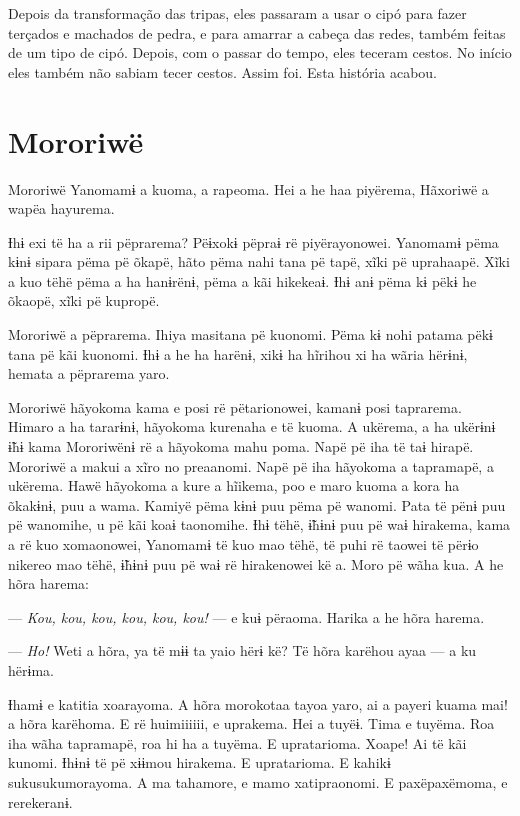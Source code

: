 Depois da transformação das tripas, eles passaram a usar o cipó para
fazer terçados e machados de pedra, e para amarrar a cabeça das redes,
também feitas de um tipo de cipó. Depois, com o passar do tempo, eles
teceram cestos. No início eles também não sabiam tecer cestos. Assim
foi. Esta história acabou.

\chapter{Mororiwë}

 Mororiwë Yanomamɨ a kuoma, a rapeoma. Hei a he haa piyërema,
Hãxoriwë a wapëa hayurema. 

Ɨhɨ exi të ha a rii pëprarema? Pëɨxokɨ pëpraɨ rë piyërayonowei. Yanomamɨ
 pëma kɨnɨ sipara pëma pë õkapë, hãto pëma nahi tana pë tapë, xĩki pë
 uprahaapë. Xĩki a kuo tëhë pëma a ha hanɨrënɨ, pëma a kãi hikekeaɨ. Ɨhɨ
 anɨ pëma kɨ pëkɨ he õkaopë, xĩki pë kupropë.

Mororiwë a pëprarema. Ihiya masitana pë kuonomi. Pëma kɨ nohi patama
pëkɨ tana pë kãi kuonomi. Ɨhɨ a he ha harënɨ, xikɨ ha hĩrihou xi ha
wãria hërɨnɨ, hemata a pëprarema yaro. 

Mororiwë hãyokoma kama e posi rë pëtarionowei, kamanɨ posi taprarema.
 Himaro a ha tararɨnɨ, hãyokoma kurenaha e të kuoma. A ukërema, a ha
 ukërɨnɨ ɨ̃hɨ kama Mororiwënɨ rë a hãyokoma mahu poma. Napë pë iha të taɨ
 hirapë. Mororiwë a makui a xĩro no preaanomi. Napë pë iha hãyokoma a
 tapramapë, a ukërema. Hawë hãyokoma a kure a hĩikema, poo e maro kuoma a
 kora ha õkakɨnɨ, puu a wama. Kamiyë pëma kɨnɨ puu pëma pë wanomi. Pata
 të pënɨ puu pë wanomihe, u pë kãi koaɨ taonomihe. Ɨhɨ tëhë, ɨ̃hɨnɨ puu pë
 waɨ hirakema, kama a rë kuo xomaonowei, Yanomamɨ të kuo mao tëhë, të
 puhi rë taowei të përɨo nikereo mao tëhë, ɨ̃hɨnɨ puu pë waɨ rë
 hirakenowei kë a. Moro pë wãha kua. A he hõra harema:

--- \textit{Kou, kou, kou, kou, kou, kou!} --- e kuɨ përaoma. Harika a he hõra
harema. 

--- \textit{Ho!} Weti a hõra, ya të mɨɨ ta yaio hërɨ kë? Të hõra karëhou ayaa --- a
ku hërɨma. 

Ɨhamɨ e katitia xoarayoma. A hõra morokotaa tayoa yaro, ai a payeri
 kuama mai! a hõra karëhoma. E rë huimiiiiii, e uprakema. Hei a tuyëɨ.
 Tima e tuyëma. Roa iha wãha tapramapë, roa hi ha a tuyëma. E upratarioma. Xoape! Ai të kãi kunomi. Ɨhɨnɨ të pë xɨɨmou hirakema. E upratarioma. E kahikɨ sukusukumorayoma. A ma tahamore, e mamo
 xatipraonomi. E paxëpaxëmoma, e rerekeranɨ. 


